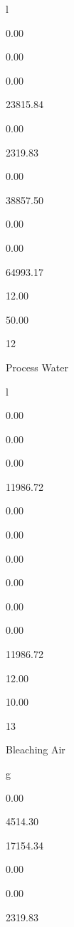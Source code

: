 \documentclass[a4paper,portrait,12pt]{article}
\begin{document}
\begin{flushleft}
l
\end{flushleft}


0.00


0.00


0.00


23815.84


0.00


2319.83


0.00


38857.50


0.00


0.00


64993.17


12.00


50.00





12


\begin{flushleft}
Process Water
\end{flushleft}


\begin{flushleft}
l
\end{flushleft}


0.00


0.00


0.00


11986.72


0.00


0.00


0.00


0.00


0.00


0.00


11986.72


12.00


10.00





13


\begin{flushleft}
Bleaching Air
\end{flushleft}


\begin{flushleft}
g
\end{flushleft}


0.00


4514.30


17154.34


0.00


0.00


2319.83
\end{document}
